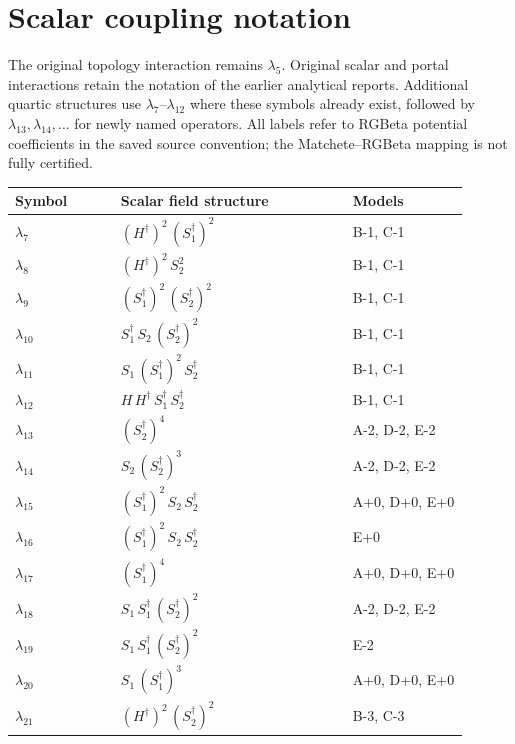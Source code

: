\documentclass[9pt,a4paper]{article}
\begin{document}
\section*{Scalar coupling notation}
The original topology interaction remains $\lambda_5$. Original scalar and portal interactions retain the notation of the earlier analytical reports. Additional quartic structures use $\lambda_7$--$\lambda_{12}$ where these symbols already exist, followed by $\lambda_{13},\lambda_{14},\ldots$ for newly named operators. All labels refer to RGBeta potential coefficients in the saved source convention; the Matchete--RGBeta mapping is not fully certified.
\begin{longtable}{@{}p{0.21\linewidth}p{0.46\linewidth}p{0.23\linewidth}@{}}
\toprule
Symbol & Scalar field structure & Models \\
\midrule
\endhead
$\lambda_{7}$ & $\left(H^\dagger\right)^{2}\, \left(S_1^\dagger\right)^{2}$ & B-1, C-1 \\
$\lambda_{8}$ & $\left(H^\dagger\right)^{2}\, S_2^{2}$ & B-1, C-1 \\
$\lambda_{9}$ & $\left(S_1^\dagger\right)^{2}\, \left(S_2^\dagger\right)^{2}$ & B-1, C-1 \\
$\lambda_{10}$ & $S_1^\dagger\, S_2\, \left(S_2^\dagger\right)^{2}$ & B-1, C-1 \\
$\lambda_{11}$ & $S_1\, \left(S_1^\dagger\right)^{2}\, S_2^\dagger$ & B-1, C-1 \\
$\lambda_{12}$ & $H\, H^\dagger\, S_1^\dagger\, S_2^\dagger$ & B-1, C-1 \\
$\lambda_{13}$ & $\left(S_2^\dagger\right)^{4}$ & A-2, D-2, E-2 \\
$\lambda_{14}$ & $S_2\, \left(S_2^\dagger\right)^{3}$ & A-2, D-2, E-2 \\
$\lambda_{15}$ & $\left(S_1^\dagger\right)^{2}\, S_2\, S_2^\dagger$ & A+0, D+0, E+0 \\
$\lambda_{16}$ & $\left(S_1^\dagger\right)^{2}\, S_2\, S_2^\dagger$ & E+0 \\
$\lambda_{17}$ & $\left(S_1^\dagger\right)^{4}$ & A+0, D+0, E+0 \\
$\lambda_{18}$ & $S_1\, S_1^\dagger\, \left(S_2^\dagger\right)^{2}$ & A-2, D-2, E-2 \\
$\lambda_{19}$ & $S_1\, S_1^\dagger\, \left(S_2^\dagger\right)^{2}$ & E-2 \\
$\lambda_{20}$ & $S_1\, \left(S_1^\dagger\right)^{3}$ & A+0, D+0, E+0 \\
$\lambda_{21}$ & $\left(H^\dagger\right)^{2}\, \left(S_2^\dagger\right)^{2}$ & B-3, C-3 \\

\end{longtable}
\end{document}
